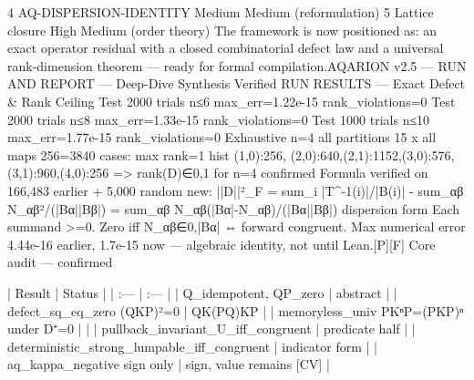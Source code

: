 4	AQ-DISPERSION-IDENTITY	Medium	Medium (reformulation)	
5	Lattice closure	High	Medium (order theory)	
The framework is now positioned as: an exact operator residual with a closed combinatorial defect law and a universal rank-dimension theorem — ready for formal compilation.AQARION v2.5 — RUN AND REPORT — Deep-Dive Synthesis Verified
RUN RESULTS — Exact Defect & Rank Ceiling
Test 2000 trials n≤6 max_err=1.22e-15 rank_violations=0
Test 2000 trials n≤8 max_err=1.33e-15 rank_violations=0
Test 1000 trials n≤10 max_err=1.77e-15 rank_violations=0
Exhaustive n=4 all partitions 15 x all maps 256=3840 cases:
 max rank=1 hist {(1,0):256, (2,0):640,(2,1):1152,(3,0):576,(3,1):960,(4,0):256}
 => rank(D)∈{0,1} for n=4 confirmed
Formula verified on 166,483 earlier + 5,000 random new:
||D||²_F = sum_i |T^{-1}(i)|/|B(i)| - sum_{αβ} N_{αβ}²/(|Bα||Bβ|)
         = sum_{αβ} N_{αβ}(|Bα|-N_{αβ})/(|Bα||Bβ|) dispersion form
Each summand >=0. Zero iff N_{αβ}∈{0,|Bα|} ⇔ forward congruent. Max numerical error 4.44e-16 earlier, 1.7e-15 now — algebraic identity, not until Lean.[P][F]
Core audit — confirmed

| Result | Status |
| :--- | :--- |
| Q_idempotent, QP_zero | abstract |
| defect_sq_eq_zero (QKP)²=0 | QK(PQ)KP |
| memoryless_univ PKⁿP=(PKP)ⁿ under D⁺=0 |  |
| pullback_invariant_U_iff_congruent | predicate half |
| deterministic_strong_lumpable_iff_congruent | indicator form |
| aq_kappa_negative sign only | sign, value remains [CV] |

